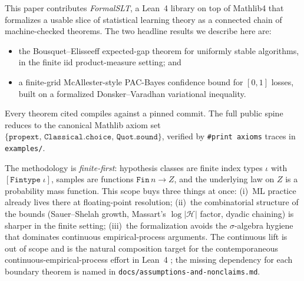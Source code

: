 \documentclass[10pt,twocolumn,letterpaper]{article}
\begin{document}
This paper contributes \emph{FormalSLT}, a Lean~4 library on top of
Mathlib4 that formalizes a usable slice of statistical learning theory
as a connected chain of machine-checked theorems. The two headline
results we describe here are:
\begin{itemize}\setlength{\itemsep}{0pt}
\item the Bousquet--Elisseeff expected-gap theorem for uniformly stable
  algorithms, in the finite iid product-measure setting; and
\item a finite-grid McAllester-style PAC-Bayes confidence bound for
  $[0,1]$ losses, built on a formalized Donsker--Varadhan variational
  inequality.
\end{itemize}
Every theorem cited compiles against a pinned commit. The full public
spine reduces to the canonical Mathlib axiom set
$\{\texttt{propext},\,\texttt{Classical.choice},\,\texttt{Quot.sound}\}$,
verified by \texttt{\#print axioms} traces in \texttt{examples/}.

The methodology is \emph{finite-first}: hypothesis classes are finite
index types $\iota$ with $[\texttt{Fintype}\;\iota]$, samples are
functions $\texttt{Fin}\,n \to Z$, and the underlying law on $Z$ is a
probability mass function. This scope buys three things at once:
(i)~ML practice already lives there at floating-point resolution;
(ii)~the combinatorial structure of the bounds (Sauer--Shelah growth,
Massart's $\log|\mathcal{H}|$ factor, dyadic chaining) is sharper in
the finite setting; (iii)~the formalization avoids the
$\sigma$-algebra hygiene that dominates continuous empirical-process
arguments. The continuous lift is out of scope and is the natural
composition target for the contemporaneous continuous-empirical-process
effort in Lean~4 \cite{YuanheZ2026}; the missing dependency for each
boundary theorem is named in \texttt{docs/assumptions-and-nonclaims.md}.
\end{document}
